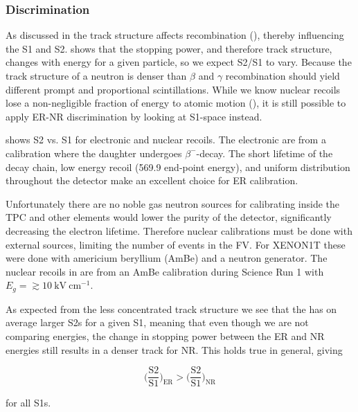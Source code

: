 \subsubsection{Discrimination}
\label{subsubsec:tpcs_signals_discr}
As discussed in  the track structure affects recombination (), thereby
influencing the S1 and S2.   shows that the stopping power, and therefore track structure, changes
with energy for a given particle, so we expect S2/S1 to vary.  Because the track structure of a neutron is denser than $\beta$ and
$\gamma$ recombination should yield different prompt and proportional scintillations.  While we know nuclear recoils lose a
non-negligible fraction of energy to atomic motion
(), it is still possible to apply ER-NR discrimination by looking at S1-space instead.

 shows S2 vs. S1 for electronic and nuclear recoils.  The electronic are from a  calibration
where the  daughter undergoes $\beta^{-}$-decay.  The short lifetime of the  decay chain, low energy
recoil (569.9 end-point energy), and uniform distribution throughout the detector make  an excellent choice for
ER calibration.

Unfortunately there are no noble gas neutron sources
for calibrating inside the TPC and other elements would lower the purity of the detector, significantly decreasing the electron
lifetime.  Therefore nuclear calibrations must be done with external sources, limiting the number of events in the FV.  For XENON1T
these were done with americium beryllium (AmBe) and a neutron generator.  The nuclear recoils in  are from
an AmBe calibration during Science Run 1 with $E_g = \gtrsim 10 \ \mathrm{kV\ cm^{-1}}$.

As expected from the less concentrated track structure we see that the 
has on average larger S2s for a given S1, meaning that even though we are not comparing energies, the change in stopping
power between the ER and NR energies still results in a denser track for NR.  This holds true in general, giving

\begin{equation}
\Big( \frac{\mathrm{S}2}{\mathrm{S}1} \Big)_{\mathrm{ER}} > \Big( \frac{\mathrm{S}2}{\mathrm{S}1} \Big)_{\mathrm{NR}}
\end{equation}

\noindent for all S1s.

